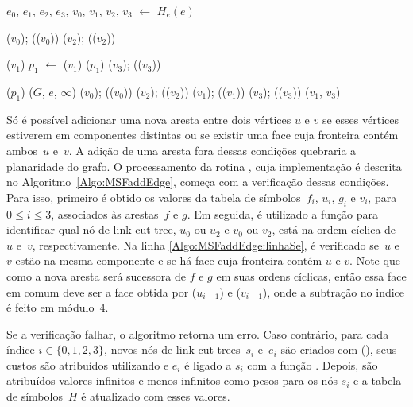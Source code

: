 \begin{algorithm}[hbt]
\caption{\MSFdelEdge($G$, $e$)}
\label{Algo:MSFdelEdge}
\begin{algorithmic}[1]
\State $e_0$, $e_1$, $e_2$, $e_3$, $v_0$, $v_1$, $v_2$, $v_3$ $\gets$ $H_e(e)$
	\label{Algo:MSFdelEdge:linha2}

\State \LCOCycle($v_0$); \LCOSplit(\treapPredecessor($v_0$))\label{Algo:MSFdelEdge:linha3}
\State \LCOCycle($v_2$); \LCOSplit(\treapPredecessor($v_2$))

\State \LCOCycle($v_1$)
\State $p_1$ $\gets$ \treapPredecessor($v_1$)
\State \LCOSplit($p_1$)
\State \LCOCycle($v_3$); \LCOSplit(\treapPredecessor($v_3$))

\State \LCOSplit($p_1$) \label{Algo:MSFdelEdge:linha12}
\Else{}
\State \MSFupdate($G$, $e$, $\infty$)\label{Algo:MSFdelEdge:linha:mudaPeso}
\State \LCOCycle($v_0$); \LCOSplit(\treapPredecessor($v_0$))
\State \LCOCycle($v_2$); \LCOSplit(\treapPredecessor($v_2$))
\State \LCOCycle($v_1$); \LCOSplit(\treapPredecessor($v_1$))
\State \LCOCycle($v_3$); \LCOSplit(\treapPredecessor($v_3$))
\State \LCOMerge($v_1$, $v_3$)
\EndIf
\end{algorithmic}
\end{algorithm}


Só é possível adicionar uma nova aresta entre dois vértices $u$ e $v$ se esses vértices estiverem em componentes distintas ou se existir uma face cuja fronteira contém ambos~$u$ e~$v$.
A adição de uma aresta fora dessas condições quebraria a planaridade do grafo. 
O processamento da rotina \MSFaddEdge{}, cuja implementação é descrita no Algoritmo~\ref{Algo:MSFaddEdge}, começa com a verificação dessas condições.
Para isso, primeiro é obtido os valores da tabela de símbolos~$f_i$, $u_i$, $g_i$ e $v_i$, para $0\leq i \leq 3$, associados às arestas~$f$ e $g$.
Em seguida, é utilizado a função \LCOFindNode{} para identificar qual nó de link cut tree, $u_0$ ou $u_2$ e $v_0$ ou $v_2$, está na ordem cíclica de~$u$ e~$v$, respectivamente.
Na linha \ref{Algo:MSFaddEdge:linhaSe}, é verificado se~$u$ e~$v$ estão na mesma componente e se há face cuja fronteira contém $u$ e $v$.
Note que como a nova aresta será sucessora de $f$ e $g$ em suas ordens cíclicas, então essa face em comum deve ser a face obtida por \LCOFindNode($u_{i-1}$) e \LCOFindNode($v_{i-1}$), onde a subtração no indice é feito em módulo~$4$.

Se a verificação falhar, o algoritmo retorna um erro. Caso contrário, para cada índice $i \in \{0, 1, 2, 3\}$, novos nós de link cut trees~$s_i$ e~$e_i$ são criados com \LCOMakeNode(), seus custos são atribuídos utilizando \LCOAddCost{} e $e_i$ é ligado a $s_i$ com a função \linkcutAddEdge{}.
Depois, são atribuídos valores infinitos e menos infinitos como pesos para os nós $s_i$ e a tabela de símbolos~$H$ é atualizado com esses valores.

